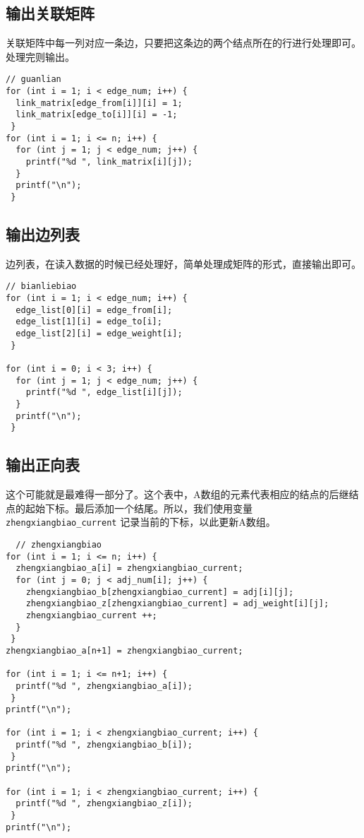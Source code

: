 \documentclass[11pt]{article}
\begin{document}
\subsection{输出关联矩阵}
\label{sec:orgebd5c28}
关联矩阵中每一列对应一条边，只要把这条边的两个结点所在的行进行处理即可。处理完则输出。

\begin{verbatim}
// guanlian
for (int i = 1; i < edge_num; i++) {
  link_matrix[edge_from[i]][i] = 1;
  link_matrix[edge_to[i]][i] = -1;
 }
for (int i = 1; i <= n; i++) {
  for (int j = 1; j < edge_num; j++) {
    printf("%d ", link_matrix[i][j]);
  }
  printf("\n");
 }
\end{verbatim}

\subsection{输出边列表}
\label{sec:org2ebc26f}
边列表，在读入数据的时候已经处理好，简单处理成矩阵的形式，直接输出即可。

\begin{verbatim}
// bianliebiao
for (int i = 1; i < edge_num; i++) {
  edge_list[0][i] = edge_from[i];
  edge_list[1][i] = edge_to[i];
  edge_list[2][i] = edge_weight[i];
 }

for (int i = 0; i < 3; i++) {
  for (int j = 1; j < edge_num; j++) {
    printf("%d ", edge_list[i][j]);
  }
  printf("\n");
 }
\end{verbatim}

\subsection{输出正向表}
\label{sec:org476b1df}
这个可能就是最难得一部分了。这个表中，A数组的元素代表相应的结点的后继结点的起始下标。最后添加一个结尾。所以，我们使用变量 \texttt{zhengxiangbiao\_current} 记录当前的下标，以此更新A数组。

\begin{verbatim}
  // zhengxiangbiao
for (int i = 1; i <= n; i++) {
  zhengxiangbiao_a[i] = zhengxiangbiao_current;
  for (int j = 0; j < adj_num[i]; j++) {
    zhengxiangbiao_b[zhengxiangbiao_current] = adj[i][j];
    zhengxiangbiao_z[zhengxiangbiao_current] = adj_weight[i][j];
    zhengxiangbiao_current ++;
  }
 }
zhengxiangbiao_a[n+1] = zhengxiangbiao_current;

for (int i = 1; i <= n+1; i++) {
  printf("%d ", zhengxiangbiao_a[i]);
 }
printf("\n");

for (int i = 1; i < zhengxiangbiao_current; i++) {
  printf("%d ", zhengxiangbiao_b[i]);
 }
printf("\n");

for (int i = 1; i < zhengxiangbiao_current; i++) {
  printf("%d ", zhengxiangbiao_z[i]);
 }
printf("\n");
\end{verbatim}
\end{document}

